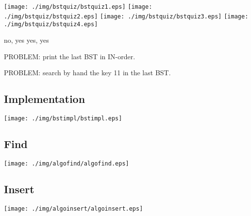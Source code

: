 \documentclass[a4paper, 9pt]{extarticle}
\begin{document}
\begin{center}
  \texttt{[image: ./img/bstquiz/bstquiz1.eps]}
  \texttt{[image: ./img/bstquiz/bstquiz2.eps]}
  \texttt{[image: ./img/bstquiz/bstquiz3.eps]}
  \texttt{[image: ./img/bstquiz/bstquiz4.eps]}
\end{center}

\begin{blackboard}
  no, yes
  yes, yes
\end{blackboard}

PROBLEM: print the last BST in IN-order.

PROBLEM: search by hand the key 11 in the last BST.

\subsection{Implementation}

\begin{center}
  \texttt{[image: ./img/bstimpl/bstimpl.eps]}
\end{center}

\subsection{Find}

\begin{center}
  \texttt{[image: ./img/algofind/algofind.eps]}
\end{center}

\begin{multicols}{2}
\columnbreak
\end{multicols}


\subsection{Insert}

\begin{center}
  \texttt{[image: ./img/algoinsert/algoinsert.eps]}
\end{center}

\begin{multicols}{2}
\columnbreak
\end{multicols}
\end{document}
